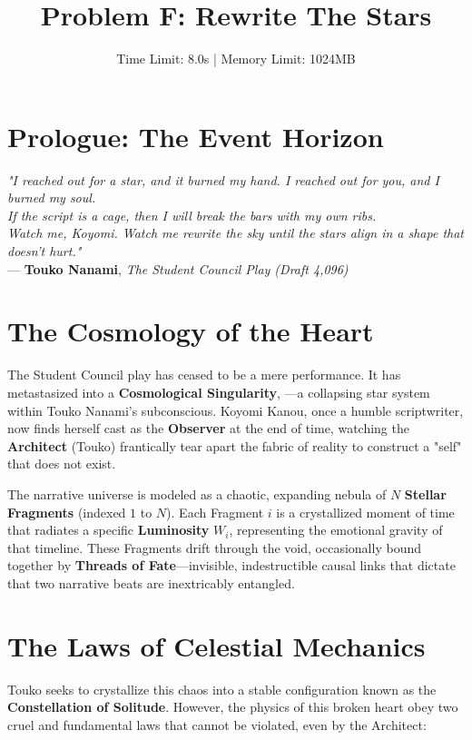 \documentclass[11pt, letterpaper]{article}
\title{\textbf{Problem F: Rewrite The Stars}}
\author{Time Limit: 8.0s | Memory Limit: 1024MB}
\date{}
\begin{document}
\maketitle

\section*{Prologue: The Event Horizon}

\begin{center}
\textit{"I reached out for a star, and it burned my hand. I reached out for you, and I burned my soul. \\ If the script is a cage, then I will break the bars with my own ribs. \\ Watch me, Koyomi. Watch me rewrite the sky until the stars align in a shape that doesn't hurt."} \\
\vspace{0.5em}
--- \textbf{Touko Nanami}, \textit{The Student Council Play (Draft 4,096)}
\end{center}

\section*{The Cosmology of the Heart}

The Student Council play has ceased to be a mere performance. It has metastasized into a \textbf{Cosmological Singularity}, —a collapsing star system within Touko Nanami's subconscious. Koyomi Kanou, once a humble scriptwriter, now finds herself cast as the \textbf{Observer} at the end of time, watching the \textbf{Architect} (Touko) frantically tear apart the fabric of reality to construct a "self" that does not exist.

The narrative universe is modeled as a chaotic, expanding nebula of $N$ \textbf{Stellar Fragments} (indexed $1$ to $N$). Each Fragment $i$ is a crystallized moment of time that radiates a specific \textbf{Luminosity} $W_i$, representing the emotional gravity of that timeline. These Fragments drift through the void, occasionally bound together by \textbf{Threads of Fate}—invisible, indestructible causal links that dictate that two narrative beats are inextricably entangled.

\section*{The Laws of Celestial Mechanics}

Touko seeks to crystallize this chaos into a stable configuration known as the \textbf{Constellation of Solitude}. However, the physics of this broken heart obey two cruel and fundamental laws that cannot be violated, even by the Architect:
\end{document}
